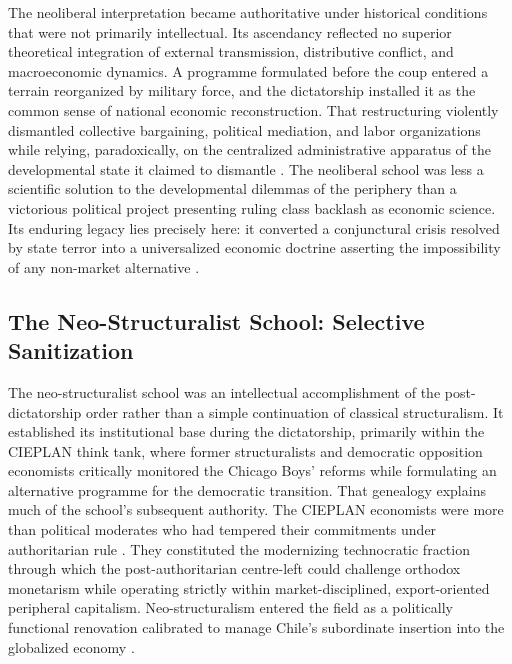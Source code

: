 The neoliberal interpretation became authoritative under historical conditions that were not 
primarily intellectual. Its ascendancy reflected no superior theoretical integration of external transmission, 
distributive conflict, and macroeconomic dynamics. A programme formulated before the coup entered a terrain 
reorganized by military force, and the dictatorship installed it as the common sense of national economic 
reconstruction. That restructuring violently dismantled collective bargaining, political mediation, and 
labor organizations while relying, paradoxically, on the centralized administrative apparatus of the developmental  state it claimed to dismantle \citep{Clark2017,Bockman2019}. The neoliberal school was less a scientific solution  to the developmental dilemmas of the periphery than a victorious political project presenting ruling class backlash as economic science. Its enduring legacy lies precisely here: it converted a conjunctural crisis resolved by state terror into a universalized economic doctrine asserting the impossibility of any non-market alternative \citep{Espinosa2021}.

\subsection{The Neo-Structuralist School: Selective Sanitization}
\label{sec:A3_neo_structuralism}

The neo-structuralist school was an intellectual accomplishment of the post-dictatorship 
order rather than a simple continuation of classical structuralism. It established its institutional 
base during the dictatorship, primarily within the CIEPLAN think tank, where former structuralists and 
democratic opposition economists critically monitored the Chicago Boys' reforms while formulating an 
alternative programme for the democratic transition. That genealogy explains much of the school's 
subsequent authority. The CIEPLAN economists were more than political moderates who had tempered their 
commitments under authoritarian rule \citep{Silva1991}. They constituted the modernizing technocratic 
fraction through which the post-authoritarian centre-left could challenge orthodox monetarism while 
operating strictly within market-disciplined, export-oriented peripheral capitalism. 
Neo-structuralism entered the field as a politically functional renovation calibrated to manage Chile's 
subordinate insertion into the globalized economy \citep{Sklair2000,Leiva2008,Maillet2016}.

